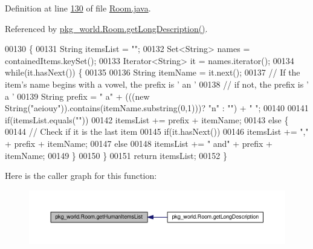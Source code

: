 Definition at line \hyperlink{Room_8java_source_l00130}{130} of file \hyperlink{Room_8java_source}{Room.\-java}.



Referenced by \hyperlink{Room_8java_source_l00120}{pkg\-\_\-world.\-Room.\-get\-Long\-Description()}.


\begin{DoxyCode}
00130                                       \{
00131         String itemsList = \textcolor{stringliteral}{""};
00132         Set<String> names = containedItems.keySet();
00133         Iterator<String> it = names.iterator();
00134         \textcolor{keywordflow}{while}(it.hasNext()) \{
00135 
00136             String itemName = it.next();
00137             \textcolor{comment}{// If the item's name begins with a vowel, the prefix is ' an '}
00138             \textcolor{comment}{// if not, the prefix is ' a '}
00139             String prefix = \textcolor{stringliteral}{" a"} + (((\textcolor{keyword}{new} String(\textcolor{stringliteral}{"aeiouy"})).contains(itemName.substring(0,1)))? \textcolor{stringliteral}{"n"} : \textcolor{stringliteral}{""}) +
       \textcolor{stringliteral}{" "};
00140 
00141             \textcolor{keywordflow}{if}(itemsList.equals(\textcolor{stringliteral}{""}))
00142                 itemsList += prefix + itemName;
00143             \textcolor{keywordflow}{else} \{
00144                 \textcolor{comment}{// Check if it is the last item}
00145                 \textcolor{keywordflow}{if}(it.hasNext())
00146                     itemsList += \textcolor{stringliteral}{","} + prefix + itemName;
00147                 \textcolor{keywordflow}{else}
00148                     itemsList += \textcolor{stringliteral}{" and"} + prefix + itemName;
00149             \}
00150         \}
00151         \textcolor{keywordflow}{return} itemsList;
00152     \}
\end{DoxyCode}


Here is the caller graph for this function\-:
\nopagebreak
\begin{figure}[H]
\begin{center}
\leavevmode
\includegraphics[width=350pt]{classpkg__world_1_1Room_a3ea436ad00d00484b429992ef94535ac_icgraph}
\end{center}
\end{figure}


